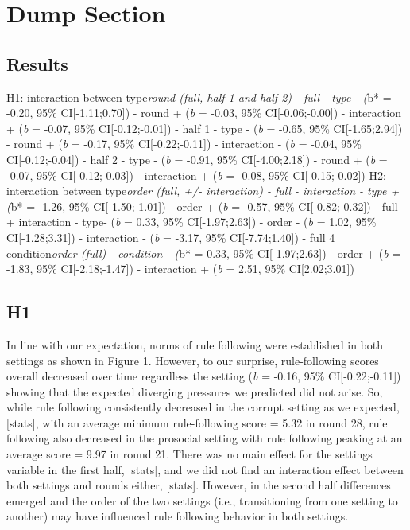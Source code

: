\documentclass[man]{apa6}
\begin{document}
\hypertarget{dump-section}{%
\section{Dump Section}\label{dump-section}}

\hypertarget{results-1}{%
\subsection{Results}\label{results-1}}

H1: interaction between type\emph{round (full, half 1 and half 2) - full
- type - (}b* = -0.20, 95\% CI{[}-1.11;0.70{]}) - round + (\emph{b} =
-0.03, 95\% CI{[}-0.06;-0.00{]}) - interaction + (\emph{b} = -0.07, 95\%
CI{[}-0.12;-0.01{]}) - half 1 - type - (\emph{b} = -0.65, 95\%
CI{[}-1.65;2.94{]}) - round + (\emph{b} = -0.17, 95\%
CI{[}-0.22;-0.11{]}) - interaction - (\emph{b} = -0.04, 95\%
CI{[}-0.12;-0.04{]}) - half 2 - type - (\emph{b} = -0.91, 95\%
CI{[}-4.00;2.18{]}) - round + (\emph{b} = -0.07, 95\%
CI{[}-0.12;-0.03{]}) - interaction + (\emph{b} = -0.08, 95\%
CI{[}-0.15;-0.02{]}) H2: interaction between type\emph{order (full, +/-
interaction) - full - interaction - type + (}b* = -1.26, 95\%
CI{[}-1.50;-1.01{]}) - order + (\emph{b} = -0.57, 95\%
CI{[}-0.82;-0.32{]}) - full + interaction - type- (\emph{b} = 0.33, 95\%
CI{[}-1.97;2.63{]}) - order - (\emph{b} = 1.02, 95\% CI{[}-1.28;3.31{]})
- interaction - (\emph{b} = -3.17, 95\% CI{[}-7.74;1.40{]}) - full 4
condition\emph{order (full) - condition - (}b* = 0.33, 95\%
CI{[}-1.97;2.63{]}) - order + (\emph{b} = -1.83, 95\%
CI{[}-2.18;-1.47{]}) - interaction + (\emph{b} = 2.51, 95\%
CI{[}2.02;3.01{]})

\hypertarget{h1}{%
\subsection{H1}\label{h1}}

In line with our expectation, norms of rule following were established
in both settings as shown in Figure 1. However, to our surprise,
rule-following scores overall decreased over time regardless the setting
(\emph{b} = -0.16, 95\% CI{[}-0.22;-0.11{]}) showing that the expected
diverging pressures we predicted did not arise. So, while rule following
consistently decreased in the corrupt setting as we expected,
{[}stats{]}, with an average minimum rule-following score = 5.32 in
round 28, rule following also decreased in the prosocial setting with
rule following peaking at an average score = 9.97 in round 21. There was
no main effect for the settings variable in the first half, {[}stats{]},
and we did not find an interaction effect between both settings and
rounds either, {[}stats{]}. However, in the second half differences
emerged and the order of the two settings (i.e., transitioning from one
setting to another) may have influenced rule following behavior in both
settings.
\end{document}
